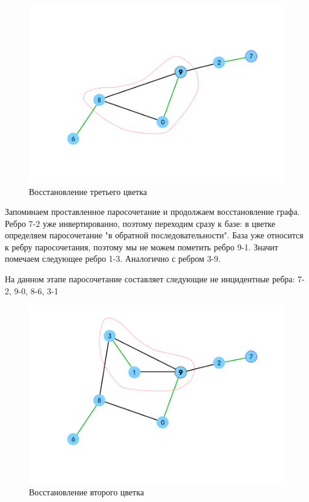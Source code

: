 \documentclass[14pt, a4paper]{extarticle}
\begin{document}
    \begin{figure}[h!]
        \centering
        \includegraphics[scale=0.3]{6.png}
        \caption{Восстановление третьего цветка}
        \label{fig:my_label}
    \end{figure} 

    Запоминаем проставленное паросочетание и продолжаем восстановление графа. Ребро 7-2 уже инвертированно, поэтому переходим сразу к базе: в цветке определяем паросочетание "в обратной последовательности". База уже относится к ребру паросочетания, поэтому мы не можем пометить ребро 9-1. Значит помечаем следующее ребро 1-3. Аналогично с ребром 3-9.  

    На данном этапе паросочетание составляет следующие не инцидентные ребра:
    7-2, 9-0, 8-6, 3-1
    
    \begin{figure}[h!]
        \centering
        \includegraphics[scale=0.3]{7.png}
        \caption{Восстановление второго цветка}
        \label{fig:my_label}
    \end{figure} 
\end{document}

